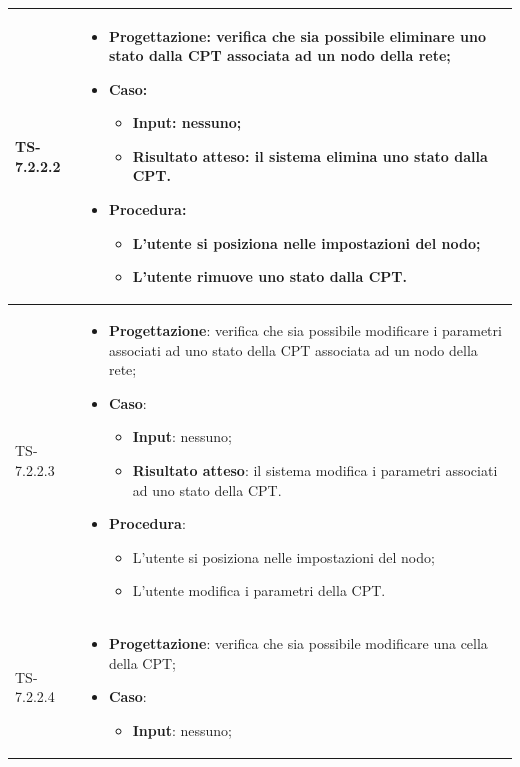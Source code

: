 \begin{longtable}{|C{2.5cm}|C{13cm}|}
	\\
	\hline
	{TS-7.2.2.2} &
\begin{itemize}
	\item \textbf{Progettazione}: verifica che sia possibile eliminare uno
	stato dalla CPT associata ad un nodo della rete;
	\item \textbf{Caso}: 
	\begin{itemize}
		\item \textbf{Input}: nessuno;
		\item \textbf{Risultato atteso}: il sistema elimina uno stato dalla CPT.
	\end{itemize}
	\item \textbf{Procedura}:
	\begin{itemize}
		\item L'utente si posiziona nelle impostazioni del nodo;
		\item L'utente rimuove uno stato dalla CPT.
	\end{itemize} 
\end{itemize}
	   \\
	\hline
	{TS-7.2.2.3} & 
\begin{itemize}
	\item \textbf{Progettazione}: verifica che sia possibile modificare i
	parametri associati ad uno stato della CPT associata ad un nodo della rete;
	\item \textbf{Caso}: 
	\begin{itemize}
		\item \textbf{Input}: nessuno;
		\item \textbf{Risultato atteso}: il sistema modifica i parametri associati ad uno stato della CPT.
	\end{itemize}
	\item \textbf{Procedura}:
	\begin{itemize}
		\item L'utente si posiziona nelle impostazioni del nodo;
		\item L'utente modifica i parametri della CPT.
	\end{itemize} 
\end{itemize}
	 \\
	\hline
	{TS-7.2.2.4} & 
\begin{itemize}
	\item \textbf{Progettazione}: verifica che sia possibile modificare una
	cella della CPT;
	\item \textbf{Caso}: 
	\begin{itemize}
		\item \textbf{Input}: nessuno;

\end{itemize}
\end{itemize}
\end{longtable}
